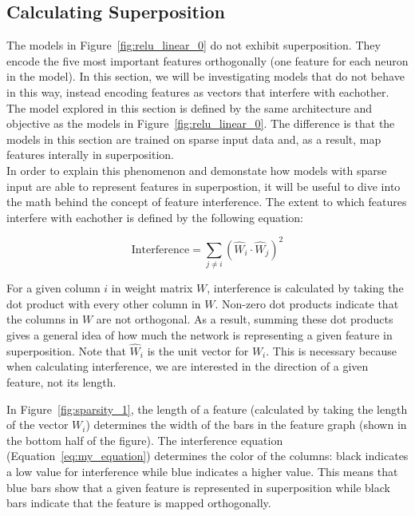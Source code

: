 \documentclass{article} %
\begin{document}
\subsection{Calculating Superposition}
\label{sec:calc_super}

The models in Figure~\ref{fig:relu_linear_0} do not exhibit superposition. They
encode the five most important features orthogonally (one feature for each
neuron in the model). In this section, we will be investigating models
that do not behave in this way, instead encoding features as vectors that interfere
with eachother. The model explored in this section is defined by the same architecture
and objective as the models in Figure~\ref{fig:relu_linear_0}. The difference
is that the models in this section are trained on sparse input data and, as a
result, map features interally in superposition. \\

In order to explain this phenomenon and demonstate how models with sparse input
are able to represent features in superpostion, it will be useful to dive into 
the math behind the concept of feature interference. The extent to which 
features interfere with eachother is defined by the following equation:

\begin{equation}
\label{eq:my_equation}
\text{Interference} = \sum_{j \neq i} (\hat{W}_i \cdot \hat{W}_j)^2
\end{equation}

For a given column $i$ in weight matrix $W$, interference is calculated by taking
the dot product with every other column in $W$. Non-zero dot products indicate
that the columns in $W$ are not orthogonal. As a result, summing these dot 
products gives a general idea of how much the network is representing a given
feature in superposition. Note that $\hat{W}_i$ is the unit vector for $W_i$. 
This is necessary because when calculating interference, we are interested in
the direction of a given feature, not its length.\newline

In Figure~\ref{fig:sparsity_1}, the length of a feature (calculated by taking the
length of the vector $W_i$) determines the width of the bars in the feature
graph (shown in the bottom half of the figure). The interference equation (Equation~\ref{eq:my_equation}) determines the
color of the columns: black indicates a low value for interference
while blue indicates a higher value. This means that blue bars show that a given feature is represented
in superposition while black bars indicate that the feature is mapped orthogonally.
    
\end{document}
